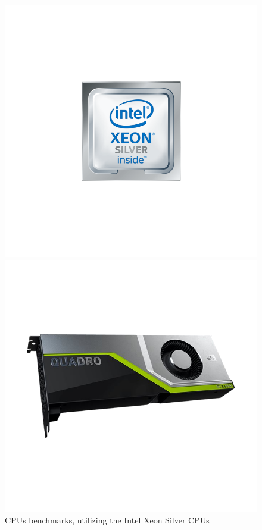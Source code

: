 \begin{figure}[hbt!]
    \captionsetup{width=.3\linewidth}
    \begin{minipage}[t]{0.3\textwidth}
        \includegraphics[width=\textwidth]{figures/devices/Intel_CPU.png}
        \caption{CPUs benchmarks, utilizing the Intel Xeon Silver CPUs}\label{fig:Intel_CPU}
    \end{minipage}\hfill
    \captionsetup{width=.3\linewidth}
    \begin{minipage}[t]{0.3\textwidth}
        \includegraphics[width=\textwidth]{figures/devices/NVIDIA_GPU.png}

\end{minipage}
\end{figure}
